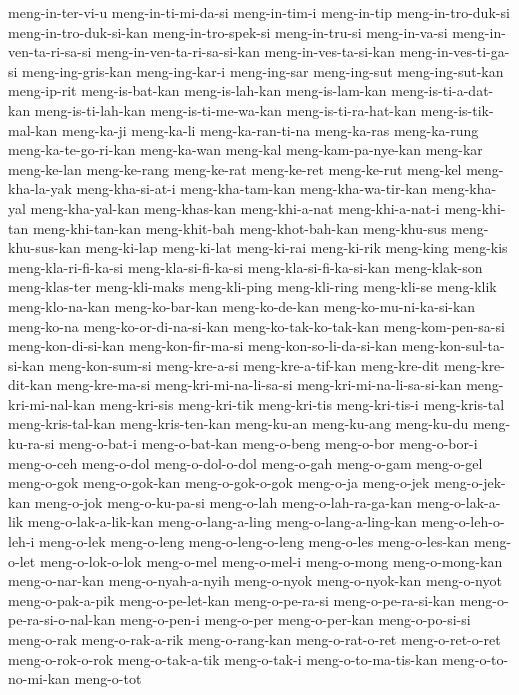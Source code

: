 {meng-in-ter-vi-u meng-in-ti-mi-da-si meng-in-tim-i meng-in-tip
meng-in-tro-duk-si meng-in-tro-duk-si-kan meng-in-tro-spek-si
meng-in-tru-si meng-in-va-si meng-in-ven-ta-ri-sa-si
meng-in-ven-ta-ri-sa-si-kan meng-in-ves-ta-si-kan meng-in-ves-ti-ga-si
meng-ing-gris-kan meng-ing-kar-i meng-ing-sar meng-ing-sut
meng-ing-sut-kan meng-ip-rit meng-is-bat-kan meng-is-lah-kan
meng-is-lam-kan meng-is-ti-a-dat-kan meng-is-ti-lah-kan
meng-is-ti-me-wa-kan meng-is-ti-ra-hat-kan meng-is-tik-mal-kan meng-ka-ji
meng-ka-li meng-ka-ran-ti-na meng-ka-ras meng-ka-rung meng-ka-te-go-ri-kan
meng-ka-wan meng-kal meng-kam-pa-nye-kan meng-kar meng-ke-lan meng-ke-rang
meng-ke-rat meng-ke-ret meng-ke-rut meng-kel meng-kha-la-yak
meng-kha-si-at-i meng-kha-tam-kan meng-kha-wa-tir-kan meng-kha-yal
meng-kha-yal-kan meng-khas-kan meng-khi-a-nat meng-khi-a-nat-i
meng-khi-tan meng-khi-tan-kan meng-khit-bah meng-khot-bah-kan meng-khu-sus
meng-khu-sus-kan meng-ki-lap meng-ki-lat meng-ki-rai meng-ki-rik meng-king
meng-kis meng-kla-ri-fi-ka-si meng-kla-si-fi-ka-si
meng-kla-si-fi-ka-si-kan meng-klak-son meng-klas-ter meng-kli-maks
meng-kli-ping meng-kli-ring meng-kli-se meng-klik meng-klo-na-kan
meng-ko-bar-kan meng-ko-de-kan meng-ko-mu-ni-ka-si-kan meng-ko-na
meng-ko-or-di-na-si-kan meng-ko-tak-ko-tak-kan meng-kom-pen-sa-si
meng-kon-di-si-kan meng-kon-fir-ma-si meng-kon-so-li-da-si-kan
meng-kon-sul-ta-si-kan meng-kon-sum-si meng-kre-a-si meng-kre-a-tif-kan
meng-kre-dit meng-kre-dit-kan meng-kre-ma-si meng-kri-mi-na-li-sa-si
meng-kri-mi-na-li-sa-si-kan meng-kri-mi-nal-kan meng-kri-sis meng-kri-tik
meng-kri-tis meng-kri-tis-i meng-kris-tal meng-kris-tal-kan
meng-kris-ten-kan meng-ku-an meng-ku-ang meng-ku-du meng-ku-ra-si
meng-o-bat-i meng-o-bat-kan meng-o-beng meng-o-bor meng-o-bor-i meng-o-ceh
meng-o-dol meng-o-dol-o-dol meng-o-gah meng-o-gam meng-o-gel meng-o-gok
meng-o-gok-kan meng-o-gok-o-gok meng-o-ja meng-o-jek meng-o-jek-kan
meng-o-jok meng-o-ku-pa-si meng-o-lah meng-o-lah-ra-ga-kan
meng-o-lak-a-lik meng-o-lak-a-lik-kan meng-o-lang-a-ling
meng-o-lang-a-ling-kan meng-o-leh-o-leh-i meng-o-lek meng-o-leng
meng-o-leng-o-leng meng-o-les meng-o-les-kan meng-o-let meng-o-lok-o-lok
meng-o-mel meng-o-mel-i meng-o-mong meng-o-mong-kan meng-o-nar-kan
meng-o-nyah-a-nyih meng-o-nyok meng-o-nyok-kan meng-o-nyot
meng-o-pak-a-pik meng-o-pe-let-kan meng-o-pe-ra-si meng-o-pe-ra-si-kan
meng-o-pe-ra-si-o-nal-kan meng-o-pen-i meng-o-per meng-o-per-kan
meng-o-po-si-si meng-o-rak meng-o-rak-a-rik meng-o-rang-kan
meng-o-rat-o-ret meng-o-ret-o-ret meng-o-rok-o-rok meng-o-tak-a-tik
meng-o-tak-i meng-o-to-ma-tis-kan meng-o-to-no-mi-kan meng-o-tot
}
